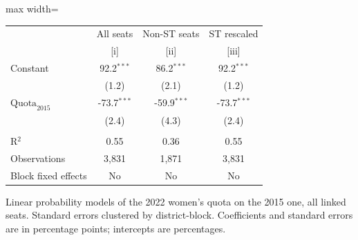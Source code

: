 
\begingroup
\centering
\scriptsize
\begin{adjustbox}{max width=\linewidth}
   \begin{threeparttable}[b]
      \begin{tabular}{lccc}
         \toprule
                                & All seats     & Non-ST seats  & ST rescaled \\
                                & [i]           & [ii]          & [iii]\\
         \midrule
         Constant               & 92.2$^{***}$  & 86.2$^{***}$  & 92.2$^{***}$\\
                                & (1.2)         & (2.1)         & (1.2)\\
         $\text{Quota}_{2015}$  & -73.7$^{***}$ & -59.9$^{***}$ & -73.7$^{***}$\\
                                & (2.4)         & (4.3)         & (2.4)\\
          \\
         R$^2$                  & 0.55          & 0.36          & 0.55\\
         Observations           & 3,831         & 1,871         & 3,831\\
         Block fixed effects    & No            & No            & No\\
         \bottomrule
      \end{tabular}

      \begin{tablenotes}
         \item Linear probability models of the 2022 women's quota on the 2015 one, all linked seats. Standard errors clustered by district-block. Coefficients and standard errors are in percentage points; intercepts are percentages.
      \end{tablenotes}
   \end{threeparttable}
\end{adjustbox}
\par\endgroup


